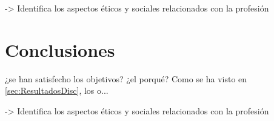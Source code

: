 \documentclass{article}
\begin{document}
    -> Identifica los aspectos éticos y sociales relacionados con la profesión


\section{Conclusiones}
\label{sec:Conclusiones}

    ¿se han satisfecho los objetivos? ¿el porqué? Como se ha visto en \ref{sec:ResultadosDisc}, los o...

    -> Identifica los aspectos éticos y sociales relacionados con la profesión




\end{document}
